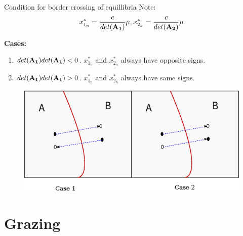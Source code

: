 \documentclass[xcolor=x11names,compress]{beamer}
\renewcommand{\(}{\begin{columns}}
\renewcommand{\)}{\end{columns}}
\newcommand{\<}[1]{\begin{column}{#1}}
\renewcommand{\>}{\end{column}}
\begin{document}
\begin{frame}{Condition for border crossing of equillibria}
Note:\\
\[
x^*_{1_n}=\frac{c}{det(\bf{A_1})}\mu, x^*_{2_k}=\frac{c}{det(\bf{A_2})}\mu
\]

{\bf Cases:}\\
\begin{enumerate}
\item $det({\bf A_1})det({\bf A_1})<0$.  $x^*_{1_n}$ and $x^*_{2_n}$ always have 
opposite signs.  \\
\item $det({\bf A_1})det({\bf A_1})>0$.  $x^*_{1_n}$ and $x^*_{2_n}$ always have 
same signs.  
\end{enumerate}

\begin{figure}
\begin{center}
\includegraphics[width=0.9\columnwidth]{cases}
\end{center}
\end{figure}

\end{frame}


\section{Grazing}
\end{document}

